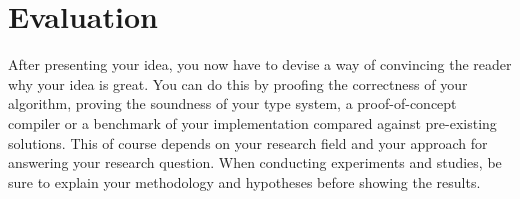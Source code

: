 \chapter{Evaluation}\label{sec:evaluation}
After presenting your idea, you now have to devise a way of convincing the reader why your idea is great.
You can do this by proofing the correctness of your algorithm, proving the soundness of your type system, a proof-of-concept compiler or a benchmark of your implementation compared against pre-existing solutions.
This of course depends on your research field and your approach for answering your research question.
When conducting experiments and studies, be sure to explain your methodology and hypotheses before showing the results.
